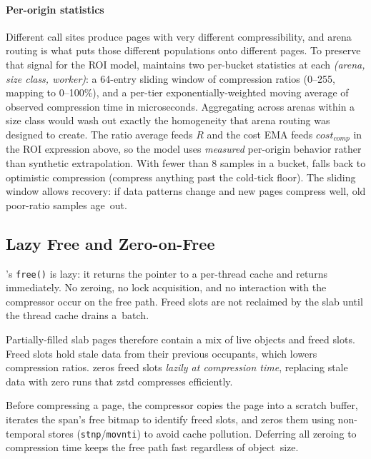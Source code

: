 \paragraph{Per-origin statistics}
Different call sites produce pages with very different
compressibility, and arena routing is what puts those
different populations onto different pages.  To preserve that
signal for the ROI model, \sys maintains two per-bucket
statistics at each \emph{(arena, size class, worker)}:
a 64-entry sliding window of compression ratios (0--255,
mapping to 0--100\%), and a per-tier exponentially-weighted
moving average of observed compression time in microseconds.
Aggregating across arenas within a size class would wash out
exactly the homogeneity that arena routing was designed to
create.  The ratio average feeds $R$ and the cost EMA feeds
$\mathit{cost}_{\mathit{comp}}$ in the ROI expression above,
so the model uses \emph{measured} per-origin behavior rather
than synthetic extrapolation.  With fewer than
8 samples in a bucket, \sys falls back to optimistic compression
(compress anything past the cold-tick floor).  The sliding
window allows recovery: if data patterns change and new pages
compress well, old poor-ratio samples age~out.

\subsection{Lazy Free and Zero-on-Free}
\label{sec:design:zero}

\sys's \texttt{free()} is lazy: it returns the pointer to a
per-thread cache and returns immediately.  No
zeroing, no lock acquisition, and no interaction with the
compressor occur on the free path.  Freed slots are not reclaimed
by the slab until the thread cache drains a~batch.

Partially-filled slab pages therefore contain a mix of live objects
and freed slots.  Freed slots hold stale data from their previous
occupants, which lowers compression ratios.  \sys zeros freed
slots \emph{lazily at compression time}, replacing stale data with
zero runs that zstd compresses efficiently.

Before compressing a page, the compressor copies the page into a
scratch buffer, iterates the span's free bitmap to identify freed
slots, and zeros them using non-temporal stores
(\texttt{stnp}/\texttt{movnti}) to avoid cache pollution.  Deferring all zeroing to
compression time keeps the free path fast regardless of object~size.

